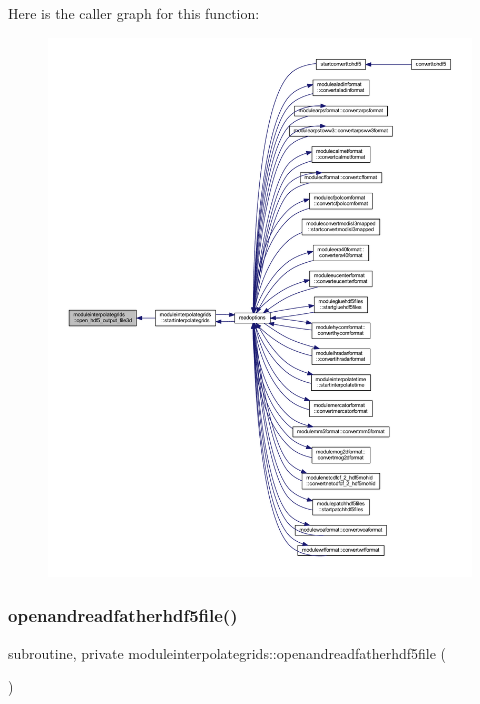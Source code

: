 Here is the caller graph for this function\+:\nopagebreak
\begin{figure}[H]
\begin{center}
\leavevmode
\includegraphics[width=350pt]{namespacemoduleinterpolategrids_a6d188a490cb72184e7a2cec4c423af97_icgraph}
\end{center}
\end{figure}
\mbox{\label{namespacemoduleinterpolategrids_ae103d8313a774b19abd42423e41be969}} 
\subsubsection{\texorpdfstring{openandreadfatherhdf5file()}{openandreadfatherhdf5file()}}
{\footnotesize\ttfamily subroutine, private moduleinterpolategrids\+::openandreadfatherhdf5file (\begin{DoxyParamCaption}{ }\end{DoxyParamCaption})\hspace{0.3cm}{\ttfamily [private]}}

